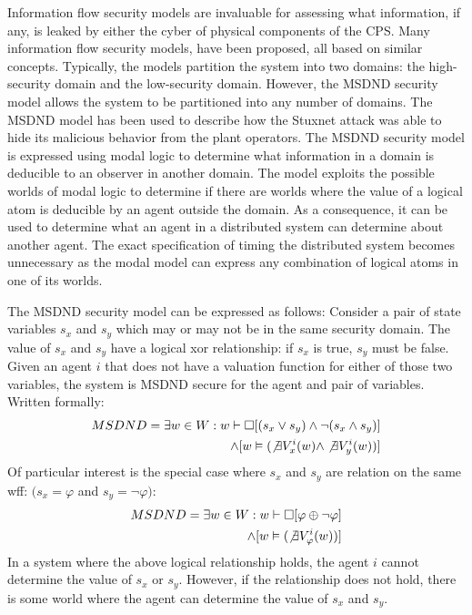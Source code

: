 Information flow security models are invaluable for assessing what information, if any, is leaked by either the cyber of physical components of the \ac{CPS}.
Many information flow security models, have been proposed, all based on similar concepts.
Typically, the models partition the system into two domains: the high-security domain and the low-security domain.
However, the MSDND security model allows the system to be partitioned into any number of domains.
The MSDND model has been used to describe how the Stuxnet attack was able to hide its malicious behavior from the plant operators.
The MSDND security model is expressed using modal logic to determine what information in a domain is deducible to an observer in another domain.
The model exploits the possible worlds of modal logic to determine if there are worlds where the value of a logical atom is deducible by an agent outside the domain.
As a consequence, it can be used to determine what an agent in a distributed system can determine about another agent.
The exact specification of timing the distributed system becomes unnecessary as the modal model can express any combination of logical atoms in one of its worlds.\cite{Howser2012}\cite{STUXNET}\cite{Howser2013}

The MSDND security model can be expressed as follows\cite{STUXNET}:
Consider a pair of state variables $s_x$ and $s_y$ which may or may not be in the same security domain.
The value of $s_x$ and $s_y$ have a logical xor relationship: if $s_x$ is true, $s_y$ must be false.
Given an agent $i$ that does not have a valuation function for either of those two variables, the system is MSDND secure for the agent and pair of variables.
Written formally:
\begin{align}
MSDND = \exists w \in W : w \vdash \Box [ (s_x \vee s_y) \wedge \neg(s_x \wedge s_y) ] 
\nonumber \\ \wedge [ w \vDash ( \not \exists V_x^i (w) \wedge \not \exists V_y^i (w) ) ]
\end{align}
Of particular interest is the special case where $s_x$ and $s_y$ are relation on the same wff: $(s_x = \varphi$ and $s_y = \neg \varphi)$:
\begin{align}
MSDND = \exists w \in W : w \vdash \Box [ \varphi \oplus \neg \varphi ] 
\nonumber \\ \wedge [ w \vDash ( \not \exists V_\varphi^i(w)) ]
\end{align}
In a system where the above logical relationship holds, the agent $i$ cannot determine the value of $s_x$ or $s_y$. However, if the relationship does not hold, there is some world where the agent can determine the value of $s_x$ and $s_y$.

